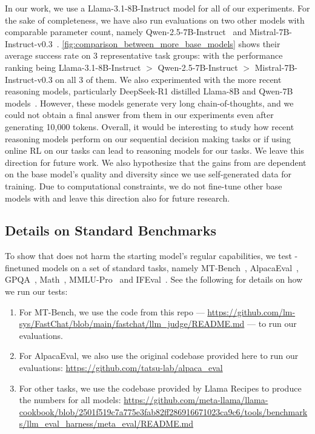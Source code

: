 In our work, we use a Llama-3.1-8B-Instruct model for all of our experiments. For the sake of completeness, we have also run evaluations on two other models with comparable parameter count, namely Qwen-2.5-7B-Instruct~\citep{qwen2025qwen25technicalreport} and Mistral-7B-Instruct-v0.3~\citep{jiang2023mistral7b}. \cref{fig:comparison_between_more_base_models} shows their average success rate on 3 representative task groups: with the performance ranking being Llama-3.1-8B-Instruct $>$ Qwen-2.5-7B-Instruct $>$ Mistral-7B-Instruct-v0.3 on all 3 of them. We also experimented with the more recent reasoning models, particularly DeepSeek-R1 distilled Llama-8B and Qwen-7B models~\citep{deepseekai2025deepseekr1incentivizingreasoningcapability}. However, these models generate very long chain-of-thoughts, and we could not obtain a final answer from them in our experiments even after generating 10,000 tokens. Overall, it would be interesting to study how recent reasoning models perform on our sequential decision making tasks or if using online RL on our tasks can lead to reasoning models for our tasks. We leave this direction for future work. We also hypothesize that the gains from \ours{} are dependent on the base model's quality and diversity since we use self-generated data for training. Due to computational constraints, we do not fine-tune other base models with \ours{} and leave this direction also for future research.

\newpage 

\subsection{Details on Standard Benchmarks} \label{appendix:standard_evaluations}

To show that \ours{} does not harm the starting model's regular capabilities, we test \ours{}-finetuned models on a set of standard tasks, namely MT-Bench~\citep{zheng2023judgingllmasajudgemtbenchchatbot,kwan2024mt}, AlpacaEval~\citep{dubois2023alpacafarm,dubois2024length,alpaca_eval}, GPQA~\citep{rein2023gpqagraduatelevelgoogleproofqa}, Math~\citep{hendrycks2021measuringmathematicalproblemsolving}, MMLU-Pro~\citep{wang2024mmluprorobustchallengingmultitask} and IFEval~\citep{zhou2023instructionfollowingevaluationlargelanguage}. See the following for details on how we run our tests:

\begin{enumerate}
    \item For MT-Bench, we use the code from this repo --- \url{https://github.com/lm-sys/FastChat/blob/main/fastchat/llm_judge/README.md} --- to run our evaluations.
    \item For AlpacaEval, we also use the original codebase provided here to run our evaluations: \url{https://github.com/tatsu-lab/alpaca_eval}
    \item For other tasks, we use the codebase provided by Llama Recipes to produce the numbers for all models: \url{https://github.com/meta-llama/llama-cookbook/blob/2501f519c7a775e3fab82ff286916671023ca9c6/tools/benchmarks/llm_eval_harness/meta_eval/README.md}
\end{enumerate}

